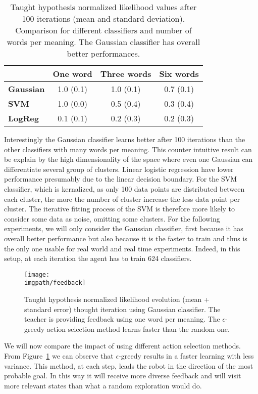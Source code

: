 \begin{table}[!t]
\caption{Taught hypothesis normalized likelihood values after 100 iterations (mean and standard deviation). Comparison for different classifiers and number of words per meaning. The Gaussian classifier has overall better performances.}
\vspace{1em}
\centering
\begin{tabular}{|l|c|c|c|}
\hline
&\textbf{One word}&\textbf{Three words}&\textbf{Six words}\\\hline
\textbf{Gaussian}&1.0 (0.1)&1.0 (0.1)&0.7 (0.1)\\\hline
\textbf{SVM}&1.0 (0.0)&0.5 (0.4)&0.3 (0.4)\\\hline
\textbf{LogReg}&0.1 (0.1)&0.2 (0.3)&0.2 (0.3)\\\hline
\end{tabular}
\end{table}

Interestingly the Gaussian classifier learns better after 100 iterations than the other classifiers with many words per meaning. This counter intuitive result can be explain by the high dimensionality of the space where even one Gaussian can differentiate several group of clusters. Linear logistic regression have lower performance presumably due to the linear decision boundary. For the SVM classifier, which is kernalized, as only 100 data points are distributed between each cluster, the more the number of cluster increase the less data point per cluster. The iterative fitting process of the SVM is therefore more likely to consider some data as noise, omitting some clusters. For the following experiments, we will only consider the Gaussian classifier, first because it has overall better performance but also because it is the faster to train and thus is the only one usable for real world and real time experiments. Indeed, in this setup, at each iteration the agent has to train 624 classifiers.

\begin{figure}[!htbp]
  \centering
  \texttt{[image: \\imgpath/feedback]}
  \caption{Taught hypothesis normalized likelihood evolution (mean + standard error) thought iteration using Gaussian classifier. The teacher is providing feedback using one word per meaning. The $\epsilon$-greedy action selection method learns faster than the random one. }
  \label{fig:FeedbackGaussianRdmGreed}
\end{figure}

We will now compare the impact of using different action selection methods. From Figure~\ref{fig:FeedbackGaussianRdmGreed} we can observe that $\epsilon$-greedy results in a faster learning with less variance. This method, at each step, leads the robot in the direction of the most probable goal.
In this way it will receive more diverse feedback and will visit more relevant states than what a random exploration would do.

